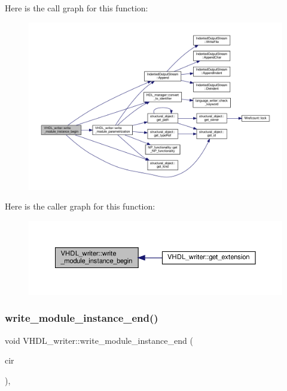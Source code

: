 Here is the call graph for this function\+:
\nopagebreak
\begin{figure}[H]
\begin{center}
\leavevmode
\includegraphics[width=350pt]{d0/d0c/structVHDL__writer_ab73e2cc602653d648cb732dc34421854_cgraph}
\end{center}
\end{figure}
Here is the caller graph for this function\+:
\nopagebreak
\begin{figure}[H]
\begin{center}
\leavevmode
\includegraphics[width=350pt]{d0/d0c/structVHDL__writer_ab73e2cc602653d648cb732dc34421854_icgraph}
\end{center}
\end{figure}
\mbox{\label{structVHDL__writer_a8aac905135d17dd707703da3b73dd6d5}} 
\subsubsection{\texorpdfstring{write\+\_\+module\+\_\+instance\+\_\+end()}{write\_module\_instance\_end()}}
{\footnotesize\ttfamily void V\+H\+D\+L\+\_\+writer\+::write\+\_\+module\+\_\+instance\+\_\+end (\begin{DoxyParamCaption}\item[{const \hyperlink{structural__objects_8hpp_a8ea5f8cc50ab8f4c31e2751074ff60b2}{structural\+\_\+object\+Ref} \&}]{cir }\end{DoxyParamCaption})\hspace{0.3cm}{\ttfamily [override]}, {\ttfamily [virtual]}}



